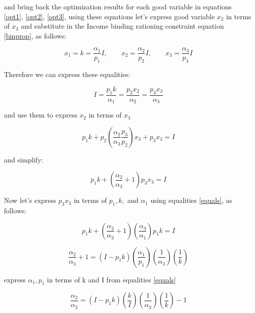 \documentclass{article}
\begin{document}
and bring back the optimization results for each good variable in equations \ref{opt1}, \ref{opt2}, \ref{opt3}, using these equations let's express good variable $x_2$ in terms of $x_3$ and substitute in the Income binding rationing constraint equation \ref{binprop}, as follows:

\begin{equation}\label{bindop}
x_1 = k = \frac{\alpha_1}{p_1}I, \qquad  x_2 = \frac{\alpha_2}{p_2}I, \qquad x_3 = \frac{\alpha_3}{p_3}I
\end{equation}

Therefore we can express these equalities:

\begin{equation}\label{equals}
  I = \frac{p_1k}{\alpha_1} = \frac{p_2x_2}{\alpha_2} = \frac{p_3x_3}{\alpha_3}
\end{equation}

and use them to express $x_2$ in terms of $x_3$

\begin{equation}
  p_1k + p_2 \left( \frac{\alpha_2}{\alpha_3} \frac{p_3}{p_2} \right)x_3 + p_3x_3 = I
\end{equation}

and simplify:

\begin{equation}
  p_1k + \left( \frac{\alpha_2}{\alpha_3}+ 1 \right)p_3x_3 = I
\end{equation}

Now let's express $p_3x_3$ in terms of $p_1, k,$ and $\alpha_1$ using equalities \ref{equals}, as follows:

\begin{equation}
  p_1k + \left( \frac{\alpha_2}{\alpha_3}+ 1 \right) \left( \frac{\alpha_3}{\alpha_1} \right) p_1k = I
\end{equation}

\begin{equation}
  \frac{\alpha_2}{\alpha_3}+ 1 = (I - p_1k) \left( \frac{\alpha_1}{p_1} \right) \left( \frac{1}{\alpha_3} \right) \left( \frac{1}{k} \right)
\end{equation}

express $\alpha_1, p_1$ in terms of k and I from equalities \ref{equals}

\begin{equation}
  \frac{\alpha_2}{\alpha_3} = (I - p_1k) \left( \frac{k}{I} \right) \left( \frac{1}{\alpha_3} \right) \left( \frac{1}{k} \right) - 1
\end{equation}
\end{document}
